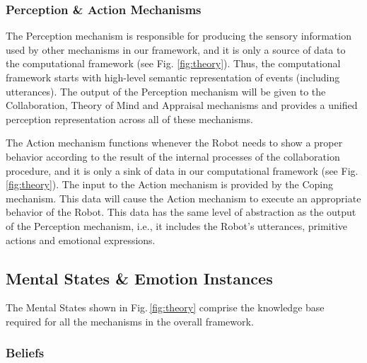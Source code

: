\subsubsection{Perception \& Action Mechanisms}
\label{sec:tom-mech}

The Perception mechanism is responsible for producing the sensory information
used by other mechanisms in our framework, and it is only a source of data to
the computational framework (see Fig. \ref{fig:theory}). Thus, the computational
framework starts with high-level semantic representation of events (including
utterances). The output of the Perception mechanism will be given to the
Collaboration, Theory of Mind and Appraisal mechanisms and provides a unified
perception representation across all of these mechanisms.

The Action mechanism functions whenever the Robot needs to show a proper
behavior according to the result of the internal processes of the collaboration
procedure, and it is only a sink of data in our computational framework (see
Fig. \ref{fig:theory}). The input to the Action mechanism is provided by the
Coping mechanism. This data will cause the Action mechanism to execute an
appropriate behavior of the Robot. This data has the same level of abstraction
as the output of the Perception mechanism, i.e., it includes the Robot's
utterances, primitive actions and emotional expressions.

\subsection{Mental States \& Emotion Instances}

The Mental States shown in Fig.\,\ref{fig:theory} comprise the knowledge base
required for all the mechanisms in the overall framework.

\subsubsection{Beliefs}
\label{sec:beliefs}

